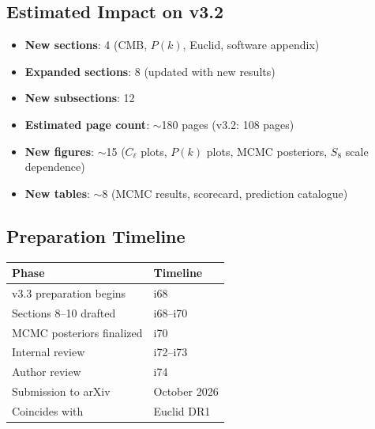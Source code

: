 \documentclass[11pt,a4paper]{article}
\begin{document}
\subsection{Estimated Impact on v3.2}

\begin{itemize}
\item \textbf{New sections}: 4 (CMB, $P(k)$, Euclid, software appendix)
\item \textbf{Expanded sections}: 8 (updated with new results)
\item \textbf{New subsections}: 12
\item \textbf{Estimated page count}: $\sim$180 pages (v3.2: 108 pages)
\item \textbf{New figures}: $\sim$15 ($C_\ell$ plots, $P(k)$ plots, MCMC posteriors, $S_8$ scale dependence)
\item \textbf{New tables}: $\sim$8 (MCMC results, scorecard, prediction catalogue)
\end{itemize}

\subsection{Preparation Timeline}

\begin{center}
\begin{tabular}{ll}
\toprule
\textbf{Phase} & \textbf{Timeline} \\
\midrule
v3.3 preparation begins & i68 \\
Sections 8--10 drafted & i68--i70 \\
MCMC posteriors finalized & i70 \\
Internal review & i72--i73 \\
Author review & i74 \\
Submission to arXiv & October 2026 \\
Coincides with & Euclid DR1 \\
\bottomrule
\end{tabular}
\end{center}
\end{document}
